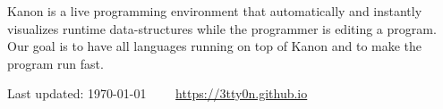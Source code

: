 \documentclass[11pt]{article} %
\newcommand{\伊澤侑祐}{\underline{伊澤侑祐}}
\begin{document}
Kanon is a live programming environment that automatically and instantly
visualizes runtime data-structures while the programmer is editing a
program. Our goal is to have all languages running on top of Kanon and to make
the program run fast.


\vfill %


\begin{center}
  \scriptsize
  Last updated: \today~~\raisebox{-0.5pt}{\textbullet}~~
  \href{https://3tty0n.github.io}{https://3tty0n.github.io}
\end{center}

\end{document}
